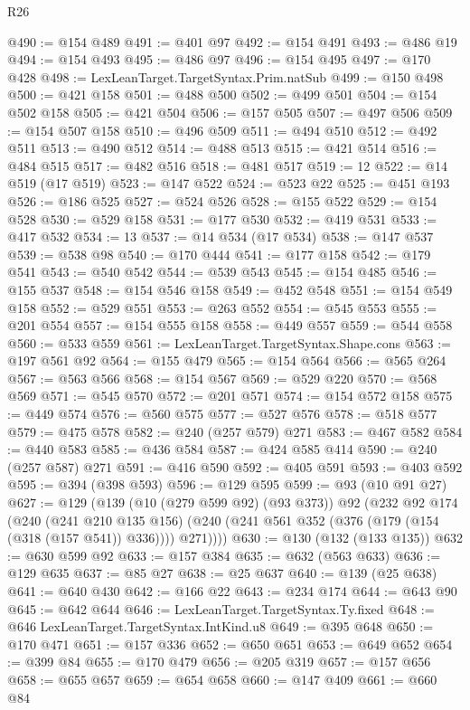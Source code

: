 \begin{lexlean}{R26}
\begin{coremodule}
@490 := @154 @489
@491 := @401 @97
@492 := @154 @491
@493 := @486 @19
@494 := @154 @493
@495 := @486 @97
@496 := @154 @495
@497 := @170 @428
@498 := LexLeanTarget.TargetSyntax.Prim.natSub
@499 := @150 @498
@500 := @421 @158
@501 := @488 @500
@502 := @499 @501
@504 := @154 @502 @158
@505 := @421 @504
@506 := @157 @505
@507 := @497 @506
@509 := @154 @507 @158
@510 := @496 @509
@511 := @494 @510
@512 := @492 @511
@513 := @490 @512
@514 := @488 @513
@515 := @421 @514
@516 := @484 @515
@517 := @482 @516
@518 := @481 @517
@519 := 12
@522 := @14 @519 (@17 @519)
@523 := @147 @522
@524 := @523 @22
@525 := @451 @193
@526 := @186 @525
@527 := @524 @526
@528 := @155 @522
@529 := @154 @528
@530 := @529 @158
@531 := @177 @530
@532 := @419 @531
@533 := @417 @532
@534 := 13
@537 := @14 @534 (@17 @534)
@538 := @147 @537
@539 := @538 @98
@540 := @170 @444
@541 := @177 @158
@542 := @179 @541
@543 := @540 @542
@544 := @539 @543
@545 := @154 @485
@546 := @155 @537
@548 := @154 @546 @158
@549 := @452 @548
@551 := @154 @549 @158
@552 := @529 @551
@553 := @263 @552
@554 := @545 @553
@555 := @201 @554
@557 := @154 @555 @158
@558 := @449 @557
@559 := @544 @558
@560 := @533 @559
@561 := LexLeanTarget.TargetSyntax.Shape.cons
@563 := @197 @561 @92
@564 := @155 @479
@565 := @154 @564
@566 := @565 @264
@567 := @563 @566
@568 := @154 @567
@569 := @529 @220
@570 := @568 @569
@571 := @545 @570
@572 := @201 @571
@574 := @154 @572 @158
@575 := @449 @574
@576 := @560 @575
@577 := @527 @576
@578 := @518 @577
@579 := @475 @578
@582 := @240 (@257 @579) @271
@583 := @467 @582
@584 := @440 @583
@585 := @436 @584
@587 := @424 @585 @414
@590 := @240 (@257 @587) @271
@591 := @416 @590
@592 := @405 @591
@593 := @403 @592
@595 := @394 (@398 @593)
@596 := @129 @595
@599 := @93 (@10 @91 @27)
@627 := @129
    (@139
      (@10 (@279 @599 @92) (@93 @373))
      @92
      (@232
        @92
        @174
        (@240
          (@241 @210 @135 @156)
          (@240 (@241 @561 @352 (@376 (@179 (@154 (@318 (@157 @541)) @336)))) @271))))
@630 := @130 (@132 (@133 @135))
@632 := @630 @599 @92
@633 := @157 @384
@635 := @632 (@563 @633)
@636 := @129 @635
@637 := @85 @27
@638 := @25 @637
@640 := @139 (@25 @638)
@641 := @640 @430
@642 := @166 @22
@643 := @234 @174
@644 := @643 @90
@645 := @642 @644
@646 := LexLeanTarget.TargetSyntax.Ty.fixed
@648 := @646 LexLeanTarget.TargetSyntax.IntKind.u8
@649 := @395 @648
@650 := @170 @471
@651 := @157 @336
@652 := @650 @651
@653 := @649 @652
@654 := @399 @84
@655 := @170 @479
@656 := @205 @319
@657 := @157 @656
@658 := @655 @657
@659 := @654 @658
@660 := @147 @409
@661 := @660 @84

\end{coremodule}
\end{lexlean}
